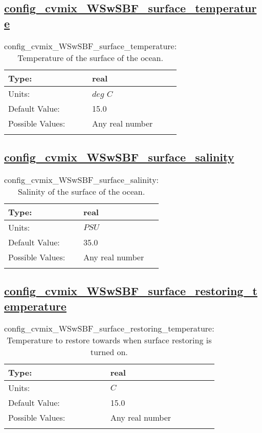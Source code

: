 \subsection[config\_cvmix\_WSwSBF\_surface\_temperature]{\hyperref[sec:nm_tab_cvmix_WSwSBF]{config\_cvmix\_WSwSBF\_surface\_temperature}}
\label{subsec:nm_sec_config_cvmix_WSwSBF_surface_temperature}
\begin{center}
\begin{longtable}{| p{2.0in} || p{4.0in} |}
    \hline
    Type: & real \\
    \hline
    Units: & $deg$ $C$ \\
    \hline
    Default Value: & 15.0 \\
    \hline
    Possible Values: & Any real number \\
    \hline
    \caption{config\_cvmix\_WSwSBF\_surface\_temperature: Temperature of the surface of the ocean.}
\end{longtable}
\end{center}
\subsection[config\_cvmix\_WSwSBF\_surface\_salinity]{\hyperref[sec:nm_tab_cvmix_WSwSBF]{config\_cvmix\_WSwSBF\_surface\_salinity}}
\label{subsec:nm_sec_config_cvmix_WSwSBF_surface_salinity}
\begin{center}
\begin{longtable}{| p{2.0in} || p{4.0in} |}
    \hline
    Type: & real \\
    \hline
    Units: & $PSU$ \\
    \hline
    Default Value: & 35.0 \\
    \hline
    Possible Values: & Any real number \\
    \hline
    \caption{config\_cvmix\_WSwSBF\_surface\_salinity: Salinity of the surface of the ocean.}
\end{longtable}
\end{center}
\subsection[config\_cvmix\_WSwSBF\_surface\_restoring\_temperature]{\hyperref[sec:nm_tab_cvmix_WSwSBF]{config\_cvmix\_WSwSBF\_surface\_restoring\_temperature}}
\label{subsec:nm_sec_config_cvmix_WSwSBF_surface_restoring_temperature}
\begin{center}
\begin{longtable}{| p{2.0in} || p{4.0in} |}
    \hline
    Type: & real \\
    \hline
    Units: & $C$ \\
    \hline
    Default Value: & 15.0 \\
    \hline
    Possible Values: & Any real number \\
    \hline
    \caption{config\_cvmix\_WSwSBF\_surface\_restoring\_temperature: Temperature to restore towards when surface restoring is turned on.}
\end{longtable}
\end{center}
